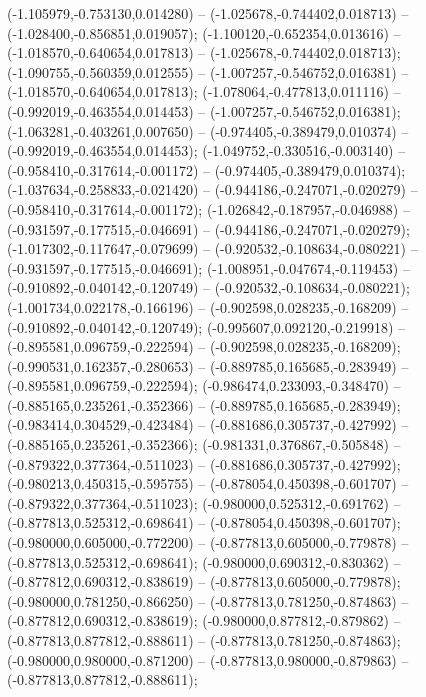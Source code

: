  (-1.105979,-0.753130,0.014280) -- (-1.025678,-0.744402,0.018713) -- (-1.028400,-0.856851,0.019057);
 (-1.100120,-0.652354,0.013616) -- (-1.018570,-0.640654,0.017813) -- (-1.025678,-0.744402,0.018713);
 (-1.090755,-0.560359,0.012555) -- (-1.007257,-0.546752,0.016381) -- (-1.018570,-0.640654,0.017813);
 (-1.078064,-0.477813,0.011116) -- (-0.992019,-0.463554,0.014453) -- (-1.007257,-0.546752,0.016381);
 (-1.063281,-0.403261,0.007650) -- (-0.974405,-0.389479,0.010374) -- (-0.992019,-0.463554,0.014453);
 (-1.049752,-0.330516,-0.003140) -- (-0.958410,-0.317614,-0.001172) -- (-0.974405,-0.389479,0.010374);
 (-1.037634,-0.258833,-0.021420) -- (-0.944186,-0.247071,-0.020279) -- (-0.958410,-0.317614,-0.001172);
 (-1.026842,-0.187957,-0.046988) -- (-0.931597,-0.177515,-0.046691) -- (-0.944186,-0.247071,-0.020279);
 (-1.017302,-0.117647,-0.079699) -- (-0.920532,-0.108634,-0.080221) -- (-0.931597,-0.177515,-0.046691);
 (-1.008951,-0.047674,-0.119453) -- (-0.910892,-0.040142,-0.120749) -- (-0.920532,-0.108634,-0.080221);
 (-1.001734,0.022178,-0.166196) -- (-0.902598,0.028235,-0.168209) -- (-0.910892,-0.040142,-0.120749);
 (-0.995607,0.092120,-0.219918) -- (-0.895581,0.096759,-0.222594) -- (-0.902598,0.028235,-0.168209);
 (-0.990531,0.162357,-0.280653) -- (-0.889785,0.165685,-0.283949) -- (-0.895581,0.096759,-0.222594);
 (-0.986474,0.233093,-0.348470) -- (-0.885165,0.235261,-0.352366) -- (-0.889785,0.165685,-0.283949);
 (-0.983414,0.304529,-0.423484) -- (-0.881686,0.305737,-0.427992) -- (-0.885165,0.235261,-0.352366);
 (-0.981331,0.376867,-0.505848) -- (-0.879322,0.377364,-0.511023) -- (-0.881686,0.305737,-0.427992);
 (-0.980213,0.450315,-0.595755) -- (-0.878054,0.450398,-0.601707) -- (-0.879322,0.377364,-0.511023);
 (-0.980000,0.525312,-0.691762) -- (-0.877813,0.525312,-0.698641) -- (-0.878054,0.450398,-0.601707);
 (-0.980000,0.605000,-0.772200) -- (-0.877813,0.605000,-0.779878) -- (-0.877813,0.525312,-0.698641);
 (-0.980000,0.690312,-0.830362) -- (-0.877812,0.690312,-0.838619) -- (-0.877813,0.605000,-0.779878);
 (-0.980000,0.781250,-0.866250) -- (-0.877813,0.781250,-0.874863) -- (-0.877812,0.690312,-0.838619);
 (-0.980000,0.877812,-0.879862) -- (-0.877813,0.877812,-0.888611) -- (-0.877813,0.781250,-0.874863);
 (-0.980000,0.980000,-0.871200) -- (-0.877813,0.980000,-0.879863) -- (-0.877813,0.877812,-0.888611);

